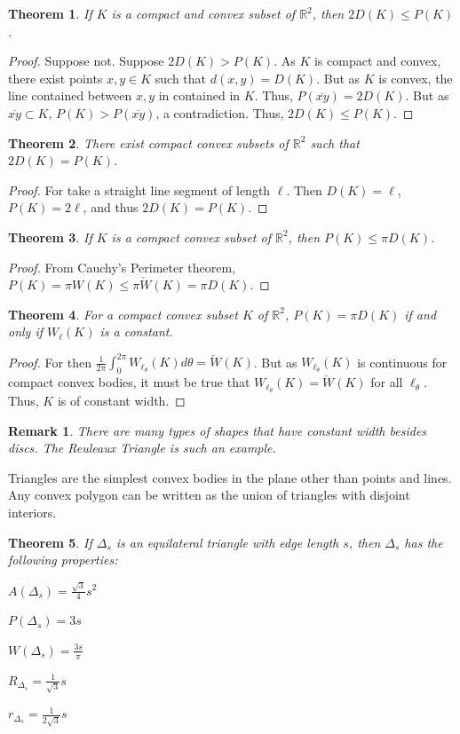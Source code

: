 \documentclass[oneside]{book}
\theoremstyle{mystyle}
\newtheorem{theorem}{Theorem}[section]
\newtheorem{remark}{Remark}[section]
\begin{document}
\begin{theorem}
If $K$ is a compact and convex subset of $\mathbb{R}^2$, then $2D(K)\leq P(K)$.
\end{theorem}
\begin{proof}
Suppose not. Suppose $2D(K) >P(K)$. As $K$ is compact and convex, there exist points $x,y\in K$ such that $d(x,y) = D(K)$. But as $K$ is convex, the line contained between $x,y$ in contained in $K$. Thus, $P(\overline{xy}) = 2D(K)$. But as $\overline{xy}\subset K$, $P(K)>P(\overline{xy})$, a contradiction. Thus, $2D(K) \leq P(K)$.
\end{proof}
%
\begin{theorem}
There exist compact convex subsets of $\mathbb{R}^2$ such that $2D(K) = P(K)$.
\end{theorem}
\begin{proof}
For take a straight line segment of length $\ell$. Then $D(K) = \ell$, $P(K) = 2\ell$, and thus $2D(K) = P(K)$.
\end{proof}
%
\begin{theorem}
If $K$ is a compact convex subset of $\mathbb{R}^2$, then $P(K) \leq \pi D(K)$.
\end{theorem}
\begin{proof}
From Cauchy's Perimeter theorem, $P(K) = \pi W(K) \leq \pi \check{W}(K) = \pi D(K)$.
\end{proof}
%
\begin{theorem}
For a compact convex subset $K$ of $\mathbb{R}^2$, $P(K) = \pi D(K)$ if and only if $W_{\ell}(K)$ is a constant.
\end{theorem}
\begin{proof}
For then $\frac{1}{2\pi} \int_{0}^{2\pi} W_{\ell_{\theta}}(K) d\theta = \check{W}(K)$. But as $W_{\ell_{\theta}}(K)$ is continuous for compact convex bodies, it must be true that $W_{\ell_{\theta}}(K) = \check{W}(K)$ for all $\ell_{\theta}$. Thus, $K$ is of constant width.
\end{proof}
%
\begin{remark}
There are many types of shapes that have constant width besides discs. The Reuleaux Triangle is such an example.
\end{remark}
%
Triangles are the simplest convex bodies in the plane other than points and lines. Any convex polygon can be written as the union of triangles with disjoint interiors. 
%
\begin{theorem}
If $\Delta_s$ is an equilateral triangle with edge length $s$, then $\Delta_s$ has the following properties:
\begin{enumerate}
\begin{multicols}{5}
\item $A(\Delta_s) = \frac{\sqrt{3}}{4}s^2$
\item $P(\Delta_s) = 3s$
\item $W(\Delta_s) = \frac{3s}{\pi}$
\item $R_{\Delta_s} = \frac{1}{\sqrt{3}}s$
\item $r_{\Delta_s} = \frac{1}{2\sqrt{3}}s$
\end{multicols}
\end{enumerate}
\end{theorem}
\end{document}
